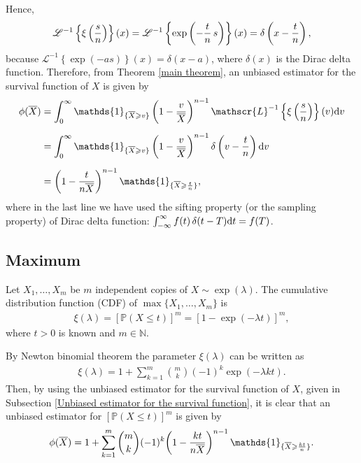 \documentclass[12pt]{article}
\theoremstyle{definition}
\begin{document}
Hence,
\begin{align*}
	\mathscr{L}^{-1}\left\{	
	{\displaystyle \xi\left({s\over n}\right)}
	\right\}
	(x)
	=
	\mathscr{L}^{-1}\left\{	
	{\displaystyle
		\exp\left(-{t\over n} \, s\right)}
	\right\}(x) 
	=
	\delta\left(x-{t\over n}\right),
\end{align*}
because $\mathscr{L}^{-1}\left\{\exp(-as)\right\}(x)=\delta(x-a)$, where $\delta(x)$ is the Dirac delta function. Therefore, from Theorem \ref{main theorem}, an unbiased estimator for the survival function of  $X$ is given by
\begin{align*}
	\phi(\overline{X})
	&=
	\int_0^{\infty} 
	\mathds{1}_{\{\overline{X}\geqslant v\}}
	\left(1-{v\over \overline{X}}\right)^{n-1} 
	\mathscr{L}^{-1}\left\{\xi\left({s\over n}\right)
	\right\}(v){\rm d}v
	\\[0,2cm]
	&=
	\int_0^{\infty} 
	\mathds{1}_{\{\overline{X}\geqslant v\}}
	\left(1-{v\over \overline{X}}\right)^{n-1} 
	\delta\left(v-{t\over n}\right)
	{\rm d}v
	\\[0,2cm]
	&=
	{\left(1 - {t\over n \overline{X}}\right)^{n-1}} \, \mathds{1}_{\{\overline{X}\geqslant {t\over n}\}},
\end{align*}
where in the last line we have used the sifting property (or the sampling property)  of Dirac delta function:  $\int _{-\infty }^{\infty }f(t)\,\delta (t-T){\rm d}t=f(T)$.





\subsection{Maximum}\label{Unbiased estimator for the maximum}

Let $X_1,\ldots,X_m$ be $m$ independent copies of $X\sim\exp(\lambda)$. The cumulative distribution function (CDF) of $\max\{X_1,\ldots,X_m\}$ is
\begin{align*}
	\xi(\lambda)=[\mathbb{P}(X\leqslant t)]^m=[1-\exp(-\lambda t)]^m,
\end{align*}
where $t>0$ is known and $m\in\mathbb{N}$. 

By Newton binomial theorem the parameter $\xi(\lambda)$ can be written as
\begin{align*}
	\xi(\lambda)=1+\sum_{k=1}^m\binom{m}{k}(-1)^k\exp(-\lambda k t).
\end{align*}
Then, by using the unbiased estimator for the survival function of $X$, given in Subsection \ref{Unbiased estimator for the survival function}, it is clear that an unbiased estimator for $[\mathbb{P}(X\leqslant t)]^m$ is given by
\begin{align*}
	\phi(\overline{X})
	=
	1
	+
	\sum_{k=1}^m\binom{m}{k}(-1)^k 	{\left(1 - {kt\over n \overline{X}}\right)^{n-1}} \, \mathds{1}_{\{\overline{X}\geqslant {kt\over n}\}}. 
\end{align*}
\end{document}
